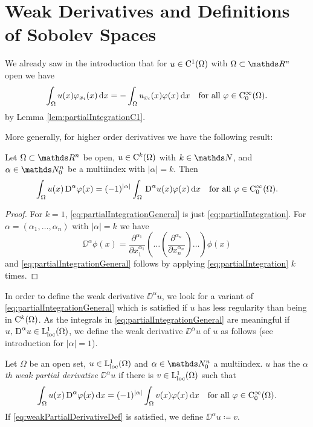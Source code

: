 \chapter{Weak Derivatives and Definitions of Sobolev Spaces}

We already saw in the introduction that for $u \in \mathrm{C}^1(\Omega)$ with $\Omega \subset \R^n$ open we have 
\begin{equation}
  \label{eq:partialIntegration}
  \int_\Omega u(x) \varphi_{x_i}(x) \, {\operatorname{d}\!{x}} = -\int_\Omega u_{x_i}(x) \varphi(x) \, {\operatorname{d}\!{x}} \quad \text{for all } \varphi \in \mathrm{C}_0^\infty(\Omega).
\end{equation}
by Lemma \ref{lem:partialIntegrationC1}.

More generally, for higher order derivatives we have the following result:
\begin{lem}
  \label{lem:partialIntegrationGeneral}
  Let $\Omega \subset \R^n$ be open, $u \in \mathrm{C}^k(\Omega)$ with $k \in \N$, and $\alpha \in \N_0^n$ be a multiindex with $|\alpha| = k$. Then
  \begin{equation}
    \label{eq:partialIntegrationGeneral}
    \int_\Omega u(x) \,{\operatorname{D}}^\alpha \varphi(x) = (-1)^{|\alpha|} \int_\Omega \,{\operatorname{D}}^\alpha u(x) \varphi(x) \, {\operatorname{d}\!{x}} \quad\text{for all } \varphi \in \mathrm{C}_0^\infty(\Omega).
  \end{equation}
\end{lem}

\begin{proof}
  For $k = 1$, \eqref{eq:partialIntegrationGeneral} is just \eqref{eq:partialIntegration}.
  For $\alpha = (\alpha_1,\dots,\alpha_n)$ with $|\alpha| = k$ we have
  $$
  \DD^\alpha \phi(x)= \frac{\partial^{\alpha_1}}{\partial x_1^{\alpha_1}} ( \dots ( \frac{\partial^{\alpha_n}}{\partial x_n^{\alpha_n}} ) \dots )\phi(x)
  $$
  and \eqref{eq:partialIntegrationGeneral} follows by applying \eqref{eq:partialIntegration} $k$ times.
\end{proof}

In order to define the weak derivative $\DD^\alpha u$, we look for a variant of \eqref{eq:partialIntegrationGeneral} which is satisfied if $u$ has less regularity than being in $\mathrm{C}^k(\Omega)$.
As the integrals in \eqref{eq:partialIntegrationGeneral} are meaningful if $u, \,{\operatorname{D}}^\alpha u \in \mathrm{L}^1_{\operatorname{loc}}(\Omega)$, we define the weak derivative $\DD^\alpha u$ of $u$ as follows (see introduction for $|\alpha| = 1$).

\begin{defn}
  \label{defn:weakPartialDerivative}
  Let $\Omega$ be an open set, $u \in \mathrm{L}^1_{\operatorname{loc}}(\Omega)$ and $\alpha \in \N_0^n$ a multiindex. 
  $u$ has the \emph{$\alpha$th weak partial derivative}  $\DD^\alpha u$ if there is $v \in \mathrm{L}_{\operatorname{loc}}^1(\Omega)$ such that
  \begin{equation}
    \label{eq:weakPartialDerivativeDef}
    \int_\Omega u(x) \,{\operatorname{D}}^\alpha \varphi(x) \, {\operatorname{d}\!{x}} = (-1)^{|\alpha|} \int_\Omega v(x) \varphi(x) \, {\operatorname{d}\!{x}} \quad \text{for all } \varphi \in \mathrm{C}_0^\infty(\Omega).
  \end{equation}
If \eqref{eq:weakPartialDerivativeDef} is satisfied, we define $\DD^\alpha u \coloneqq v$.
\end{defn}

